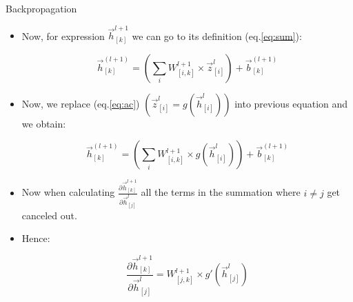 \documentclass[handout]{beamer}
\begin{document}
\begin{frame}{Backpropagation}
\begin{scriptsize}

\begin{itemize}
\item Now, for expression $\vec{h}_{[k]}^{l+1}$ we can go to its definition (eq.\ref{eq:sum}): 

\begin{displaymath}
\vec{h}_{[k]}^{(l+1)} = \left( \sum_{i} W_{[i,k]}^{l+1} \times \vec{z}_{[i]}^{l}\right) + \vec{b}_{[k]}^{(l+1)} 
\end{displaymath}

\item Now, we replace (eq.\ref{eq:ac}) $(\vec{z}_{[i]}^{l} = g(\vec{h}_{[i]}^{l}))$  
into previous equation and we obtain:

\begin{displaymath}
\vec{h}_{[k]}^{(l+1)} = \left( \sum_{i}   W_{[i,k]}^{l+1} \times g(\vec{h}_{[i]}^{l})\right)  + \vec{b}_{[k]}^{(l+1)}
\end{displaymath}


\item Now when calculating $\frac{\partial \vec{h}_{[k]}^{l+1}}{\partial \vec{h}_{[j]}^l}$ all the terms in the summation where $i \neq j$ get canceled out.   


\item Hence:

\begin{equation}
\frac{\partial \vec{h}_{[k]}^{l+1}}{\partial \vec{h}_{[j]}^l} =  W_{[j,k]}^{l+1} \times g'(\vec{h}_{[j]}^{l})
\label{eq:partialhh}
\end{equation}


\end{itemize}

\end{scriptsize}
\end{frame}
\end{document}
